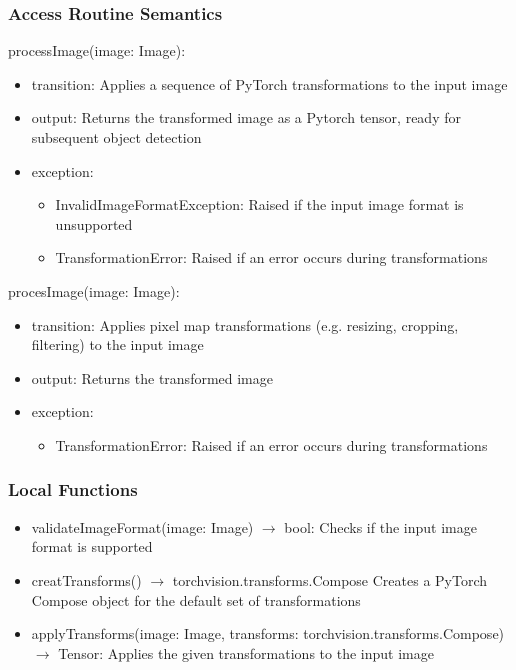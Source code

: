\documentclass[12pt, titlepage]{article}
\begin{document}
\subsubsection{Access Routine Semantics}

\noindent processImage(image: Image):
\begin{itemize}
\item transition: Applies a sequence of PyTorch transformations to the input image 
\item output: Returns the transformed image as a Pytorch tensor, ready for subsequent object detection
\item exception: 
\begin{itemize}
  \item InvalidImageFormatException: Raised if the input image format is unsupported
  \item TransformationError: Raised if an error occurs during transformations
\end{itemize}

\end{itemize}
\noindent procesImage(image: Image):
\begin{itemize}
  \item transition: Applies pixel map transformations (e.g. resizing, cropping, filtering) to the input image
  \item output: Returns the transformed image
  \item exception: 
  \begin{itemize}
    \item TransformationError: Raised if an error occurs during transformations
  \end{itemize}
  
  \end{itemize}

\subsubsection{Local Functions}

\begin{itemize}
  \item validateImageFormat(image: Image) $\rightarrow$ bool: Checks if the input image format is supported
  \item creatTransforms() $\rightarrow$ torchvision.transforms.Compose\: Creates a PyTorch Compose object for the default set of transformations
  \item applyTransforms(image: Image, transforms: torchvision.transforms.Compose) $\rightarrow$ Tensor: Applies the given transformations to the input image
\end{itemize}
\end{document}
